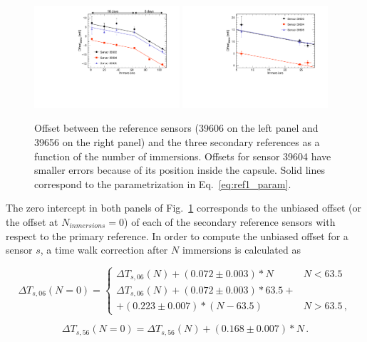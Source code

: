 \begin{figure}[htbp]
\centering
{\includegraphics[width=0.48\textwidth]{images/figure_12_a.pdf}}
{\includegraphics[width=0.48\textwidth]{images/figure_12_b.pdf}}
\caption{Offset between the reference sensors (39606 on the left panel and 39656 on the right panel) and the three secondary references as a function of the number of immersions. Offsets for sensor 39604 have smaller errors because of its position inside the capsule. Solid lines correspond to the parametrization in Eq.~\ref{eq:ref1_param}.}
\label{fig:offset_ref}
\end{figure}

The zero intercept in both panels of Fig.~\ref{fig:offset_ref} corresponds to the unbiased offset (or the offset at $N_{inmersions}=0$) of each of the secondary reference sensors with respect to the primary reference. In order to compute the unbiased offset for a sensor $s$, a time walk correction after $N$ immersions is calculated as 

\begin{equation}
\Delta T_{s,06}(N=0)=
    \begin{cases}
        \Delta T_{s,06}(N)+(0.072\pm0.003)*N                             & N<63.5\\
        \Delta T_{s,06}(N)+(0.072\pm0.003)*63.5+\\+(0.223\pm0.007)*(N-63.5) & N>63.5 \,,
    \end{cases}
    \label{eq:ref1_param}
\end{equation}

\begin{equation}
\Delta T_{s,56}(N=0)=\Delta T_{s,56}(N)+(0.168\pm0.007)*N  \, .
\label{eq:ref2_param}
\end{equation}

